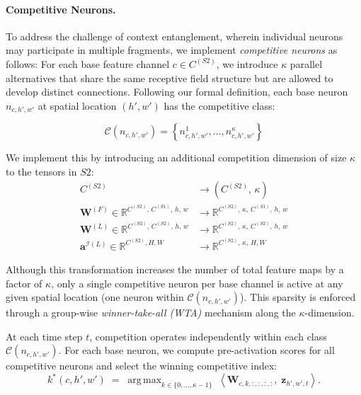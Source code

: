 \documentclass[12pt]{article}
\DeclareMathOperator*{\argmax}{arg\,max}
\begin{document}
\paragraph{Competitive Neurons.}
To address the challenge of context entanglement, wherein individual neurons may participate in multiple fragments, we implement \emph{competitive neurons} as follows: For each base feature channel $c \in C^{(S2)}$, we introduce $\kappa$ parallel alternatives that share the same receptive field structure but are allowed to develop distinct connections. Following our formal definition, each base neuron $n_{c,h',w'}$ at spatial location $(h',w')$ has the competitive class:

\begin{equation}
    \mathcal{C} \left( n_{c,h',w'} \right) = \left\{ n_{c,h',w'}^1, \dots, n_{c,h',w'}^\kappa\right\}
\end{equation}

We implement this by introducing an additional competition dimension of size $\kappa$ to the tensors in $S2$:
%
\begin{equation}
\begin{aligned}
   C^{(S2)} &\to (C^{(S2)},\,\kappa)\\
   \boldsymbol{W}^{(F)}\in\mathbb R^{C^{(S2)},\,C^{(S1)},\,h,\,w}
   &\to
   \mathbb R^{C^{(S2)},\,\kappa,\,C^{(S1)},\,h,\,w}\\
   \boldsymbol{W}^{(L)}\in\mathbb R^{C^{(S2)},\,C^{(S2)},\,h,\,w}
   &\to
   \mathbb R^{C^{(S2)},\,\kappa,\,C^{(S2)},\,h,\,w}\\
   \boldsymbol{a}^{\mathcal{I}(L)}\in\mathbb R^{C^{(S2)},H,W}
   &\to
   \mathbb R^{C^{(S2)},\,\kappa,\,H,W}
\end{aligned}
\end{equation}

Although this transformation increases the number of total feature maps by a factor of $\kappa$, only a single competitive neuron per base channel is active at any given spatial location (one neuron within $\mathcal{C} \left( n_{c,h',w'} \right)$). This sparsity is enforced through a group-wise \emph{winner-take-all (WTA)} mechanism along the $\kappa$-dimension.

At each time step $t$, competition operates independently within each class $\mathcal{C} \left( n_{c,h',w'} \right)$. For each base neuron, we compute pre-activation scores for all competitive neurons and select the winning competitive index:
%
\begin{equation}
  k^*(c,h',w') \;=\;
  \argmax_{k \in \{0,\dots,\kappa-1\}}\;
    \left\langle
      \boldsymbol{W}_{c,k,:,:,:,:},\;
      \boldsymbol{z}_{h',w',t}
    \right\rangle.
\end{equation}
\end{document}
